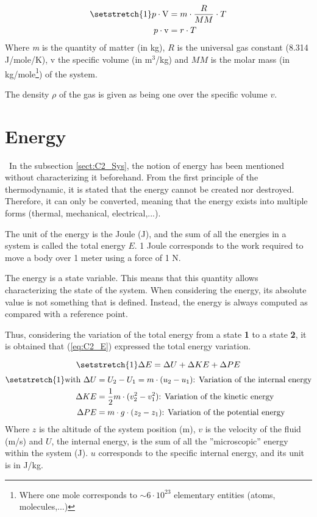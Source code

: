 \begin{align}
\setstretch{1}
p\cdot \mathrm{V} &= m\cdot\frac{R}{MM}\cdot T\nonumber\\
p\cdot \mathrm{v} &= r\cdot T\label{eq:C2_GP}    
\end{align}
Where \textit{m} is the quantity of matter (in kg), $R$ is the universal gas constant (8.314 J/mole/K), $\mathrm{v}$ the specific volume (in m$^3$/kg) and $MM$ is the molar mass (in kg/mole\footnote{Where one mole corresponds to $\sim 6\cdot 10^{23}$ elementary entities (atoms, molecules,...)}) of the system. 

The density $\rho$ of the gas is given as being one over the specific volume $v$.
\section{Energy}\label{sect:C2_Ener}
\quad\, In the subsection \ref{sect:C2_Sys}, the notion of energy has been mentioned without characterizing it beforehand. From the first principle of the thermodynamic, it is stated that the energy cannot be created nor destroyed. Therefore, it can only be converted, meaning that the energy exists into multiple forms (thermal, mechanical, electrical,...)\cite{thermoApp_2}. 

The unit of the energy is the Joule (J), and the sum of all the energies in a system is called the total energy $E$. 1 Joule corresponds to the work required to move a body over 1 meter using a force of 1 N.

The energy is a state variable. This means that this quantity allows characterizing the state of the system. When considering the energy, its absolute value is not something that is defined. Instead, the energy is always computed as compared with a reference point.

Thus, considering the variation of the total energy from a state \textbf{1} to a state \textbf{2}, it is obtained that (\ref{eq:C2_E}) expressed the total energy variation.

\begin{equation}
\setstretch{1}
    \Delta E = \Delta U + \Delta KE + \Delta PE \label{eq:C2_E}
\end{equation}
\begin{align*}
\setstretch{1}
    \text{with } \Delta U  &= U_2 - U_1 =  m\cdot(u_2 - u_1) \text{: Variation of the internal energy}\\
                 \Delta KE &= \frac{1}{2}m\cdot(v^2_2 - v^2_1)\text{: Variation of the kinetic energy}\\
                 \Delta PE &= m\cdot g\cdot(z_2 - z_1)\text{: Variation of the potential energy}
\end{align*} 
Where $z$ is the altitude of the system position (m), $v$ is the velocity of the fluid (m/s) and $U$, the internal energy, is the sum of all the ''microscopic'' energy within the system (J). $u$ corresponds to the specific internal energy, and its unit is in J/kg.

